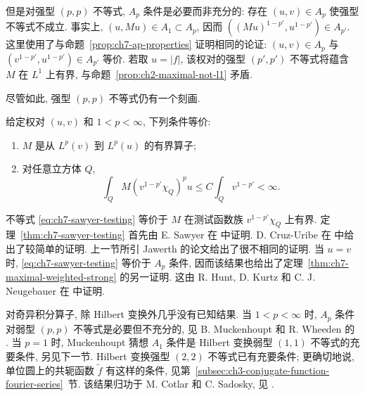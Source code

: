 但是对强型 $(p,p)$ 不等式, $A_p$ 条件是必要而非充分的: 存在 $(u,v)\in A_p$ 使强型不等式不成立. 事实上, $(u,Mu)\in A_1\subset A_p$, 因而 $((Mu)^{1-p'},u^{1-p'})\in A_{p'}$. 这里使用了与命题~\ref{prop:ch7-ap-properties} 证明相同的论证: $(u,v)\in A_p$ 与 $(v^{1-p'},u^{1-p'})\in A_{p'}$ 等价. 若取 $u=|f|$, 该权对的强型 $(p',p')$ 不等式将蕴含 $M$ 在 $L^1$ 上有界, 与命题~\ref{prop:ch2-maximal-not-l1} 矛盾.

尽管如此, 强型 $(p,p)$ 不等式仍有一个刻画.

\hypertarget{chapter-07-page-167}{}
\begin{Theorem}
\label{thm:ch7-sawyer-testing}
给定权对 $(u,v)$ 和 $1<p<\infty$, 下列条件等价:
\begin{enumerate}[label=(\arabic*)]
\item $M$ 是从 $L^p(v)$ 到 $L^p(u)$ 的有界算子;
\item 对任意立方体 $Q$,
\begin{equation}
\label{eq:ch7-sawyer-testing}
 \int_QM(v^{1-p'}\chi_Q)^pu
 \le C\int_Qv^{1-p'}<\infty.
\end{equation}
\end{enumerate}
\end{Theorem}

不等式 \eqref{eq:ch7-sawyer-testing} 等价于 $M$ 在测试函数族 $v^{1-p'}\chi_Q$ 上有界. 定理~\ref{thm:ch7-sawyer-testing} 首先由 E. Sawyer 在  中证明. D. Cruz-Uribe 在  中给出了较简单的证明. 上一节所引 Jawerth 的论文给出了很不相同的证明. 当 $u=v$ 时, \eqref{eq:ch7-sawyer-testing} 等价于 $A_p$ 条件, 因而该结果也给出了定理~\ref{thm:ch7-maximal-weighted-strong} 的另一证明. 这由 R. Hunt, D. Kurtz 和 C. J. Neugebauer 在  中证明.

对奇异积分算子, 除 Hilbert 变换外几乎没有已知结果. 当 $1<p<\infty$ 时, $A_p$ 条件对弱型 $(p,p)$ 不等式是必要但不充分的, 见 B. Muckenhoupt 和 R. Wheeden 的 . 当 $p=1$ 时, Muckenhoupt 猜想 $A_1$ 条件是 Hilbert 变换弱型 $(1,1)$ 不等式的充要条件, 另见下一节. Hilbert 变换强型 $(2,2)$ 不等式已有充要条件; 更确切地说, 单位圆上的共轭函数 $\widetilde f$ 有这样的条件, 见第~\ref{subsec:ch3-conjugate-function-fourier-series}~节. 该结果归功于 M. Cotlar 和 C. Sadosky, 见 .

